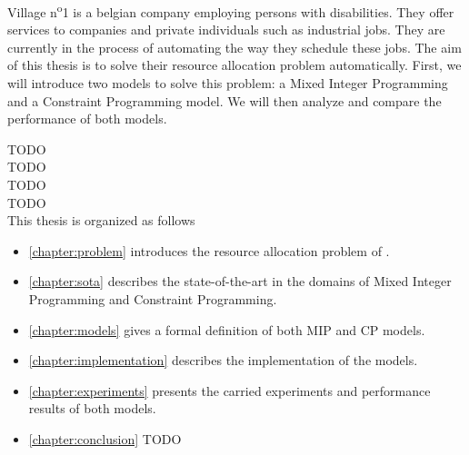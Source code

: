 \documentclass[../thesis.tex]{subfiles}
\begin{document}
Village n\textsuperscript{o}1 is a belgian company employing persons with disabilities.
They offer services to companies and private individuals such as industrial jobs.
They are currently in the process of automating the way they schedule these jobs. 
The aim of this thesis is to solve their resource allocation problem
automatically. First, we will introduce two models to solve this problem: a Mixed Integer Programming and 
a Constraint Programming model. We will then analyze and compare the performance of both models. 



TODO \\ 
TODO\\ 
TODO\\ 
TODO\\



This thesis is organized as follows

\begin{itemize}
  \item[] \autoref{chapter:problem} introduces the resource allocation problem of \vone.
  \item[] \autoref{chapter:sota} describes the state-of-the-art in the domains of Mixed Integer Programming and Constraint Programming. 
  \item[] \autoref{chapter:models} gives a formal definition of both MIP and CP models.
  \item[] \autoref{chapter:implementation} describes the implementation of the models.
  \item[] \autoref{chapter:experiments} presents the carried experiments and performance results of both models.
  \item[] \autoref{chapter:conclusion} TODO  
\end{itemize}
\end{document}
